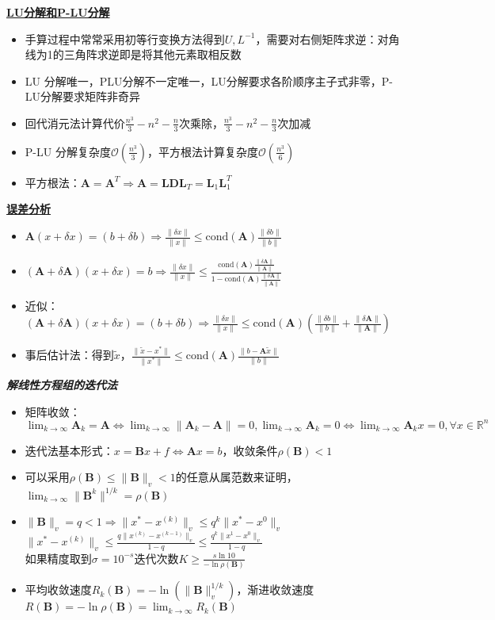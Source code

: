 \documentclass[UTF8,a4paper,landscape,compress]{paper}
\renewcommand{\subsection}[1]{{\small\textbf{\underline{#1}}}\\ }
\renewcommand{\section}[1]{{\normalsize\textbf{\emph{#1}}}\\ }
\newcommand{\List}[1]{\begin{itemize}[fullwidth,itemindent=0em] #1 \end{itemize}}
\begin{document}
\begin{multicols}{4}
    \subsection{LU分解和P-LU分解}
    \List{
        \item {手算过程中常常采用初等行变换方法得到$U,L^{-1}$，需要对右侧矩阵求逆：对角线为1的三角阵求逆即是将其他元素取相反数}
        \item {LU 分解唯一，PLU分解不一定唯一，LU分解要求各阶顺序主子式非零，P-LU分解要求矩阵非奇异}
        \item {回代消元法计算代价$\frac{n^3}{3}-n^2-\frac n3$次乘除，$\frac{n^3}{3}-n^2-\frac n3$次加减}
        \item {P-LU 分解复杂度$\mathcal O(\frac{n^3}3)$，平方根法计算复杂度$\mathcal O(\frac{n^3}6)$}
        \item {平方根法：$\bm A = \bm A^T \Rightarrow \bm A = \bm L\bm D \bm L_T = \bm L_1 \bm L_1^T$}
    }
    \subsection{误差分析}
    \List{
        \item {$\bm A(x+\delta x) = (b+\delta b) \Rightarrow \frac{\|\delta x\|}{\|x\|}\le \mathrm{cond}(\bm A) \frac{\|\delta b\|}{\|b\|}$}
        \item {$(\bm A + \delta\bm A)(x+\delta x) = b \Rightarrow \frac{\|\delta x\|}{\|x\|}\le \frac{\mathrm{cond}(\bm A) \frac{\| \delta \bm A\|}{\|\bm A\|}}{1-\mathrm{cond}(\bm A)\frac{\| \delta \bm A\|}{\|\bm A\|}}$}
        \item {近似：$(\bm A + \delta\bm A)(x+\delta x) = (b+\delta b) \Rightarrow \frac{\|\delta x\|}{\|x\|}\le \mathrm{cond}(\bm A) (\frac{\|\delta b\|}{\|b\|} + \frac{ \|\delta \bm A\|}{\|\bm A\|})$}
        \item {事后估计法：得到$\widetilde x$，$\frac{\|\widetilde x - x^*\|}{\|x^*\|} \le \mathrm{cond}(\bm A)\frac{\|b - \bm A \widetilde x\|}{\|b\|}$}
    }
\section{解线性方程组的迭代法}
    \List{
        \item {矩阵收敛：$\lim_{k\to\infty}\bm A_k = \bm A\iff\lim_{k\to\infty}\|\bm A_k-\bm A\| = 0,\lim_{k\to\infty} \bm A_k =0 \iff \lim_{k\to\infty} \bm A_kx=0, \forall x\in \mathbb R^n$}
        \item {迭代法基本形式：$x = \bm B x + f \iff \bm A x = b$，收敛条件$\rho(\bm B) < 1$}
        \item {可以采用$\rho(\bm B) \le \|\bm B\|_v <1$的任意从属范数来证明，$\lim_{k\to\infty}\|\bm B^k\|^{1/k} = \rho (\bm B)$}
        \item {$\|\bm B\|_v = q < 1 \Rightarrow \|x^*-x^{(k)}\|_v \le q^k \|x^*-x^0\|_v$\\ $\|x^*-x^{(k)}\|_v \le \frac{q\|x^{(k)}-x^{(k-1)}\|_v}{1-q} \le \frac{q^k\|x^{1}-x^{0}\|_v}{1-q} $\\ 如果精度取到$\sigma = 10^{-s}$迭代次数$K \ge \frac{s\ln10}{-\ln\rho (\bm B)}$}
        \item {平均收敛速度$R_k(\bm B) = -\ln(\|\bm B\|_v^{1/k})$，渐进收敛速度$R(\bm B) = -\ln \rho (\bm B) = \lim_{k\to\infty}R_k(\bm B)$}
    }

\end{multicols}
\end{document}
